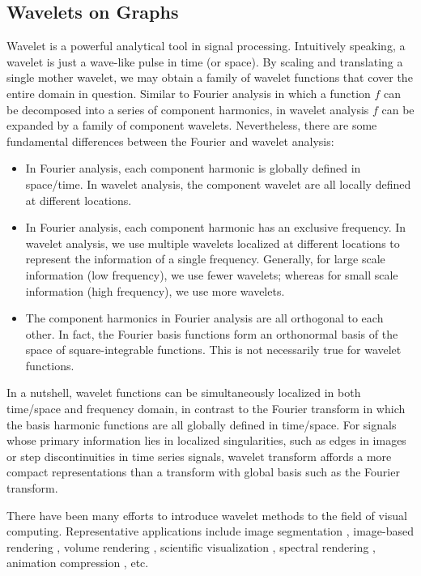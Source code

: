 \subsection*{Wavelets on Graphs}

Wavelet is a powerful analytical tool in signal processing. Intuitively speaking, 
a wavelet is just a wave-like pulse in time (or space). By scaling and translating
a single mother wavelet, we may obtain a family of wavelet functions that cover 
the entire domain in question. Similar to Fourier analysis in which a function $f$ 
can be decomposed into a series of component harmonics, in wavelet analysis $f$ 
can be expanded by a family of component wavelets. Nevertheless, there are some 
fundamental differences between the Fourier and wavelet analysis:

\begin{itemize}
\item In Fourier analysis, each component harmonic is globally defined in space/time. In wavelet analysis, the component wavelet are all locally defined at different locations.
\item In Fourier analysis, each component harmonic has an exclusive frequency. In wavelet analysis, we use multiple wavelets localized at different locations to represent the information of a single frequency. Generally, for large scale information (low frequency), we use fewer wavelets; whereas for small scale information (high frequency), we use more wavelets.
\item The component harmonics in Fourier analysis are all orthogonal to each other. In fact, the Fourier basis functions form an orthonormal basis of the space of square-integrable functions. This is not necessarily true for wavelet functions.
\end{itemize}

In a nutshell, wavelet functions can be simultaneously localized in both time/space and frequency domain,
in contrast to the Fourier transform in which the basis harmonic functions are all globally defined
in time/space. For signals whose primary information lies in localized singularities, such as edges
in images or step discontinuities in time series signals, wavelet transform affords a more compact
representations than a transform with global basis such as the Fourier transform.

There have been many efforts to introduce wavelet methods to the field of visual computing.
Representative applications include image segmentation \cite{Figueiredo:2005:CVPR},
image-based rendering \cite{Overbeck:2009:TOG}, volume rendering \cite{Lippert:1995},
scientific visualization \cite{Cracium:2005:TVCG}, spectral rendering \cite{Iehl:2000:CGF},
animation compression \cite{Payan:2007:CG}, etc.

